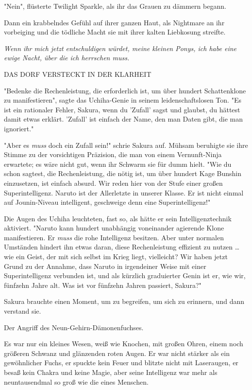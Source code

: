 {"Nein", flüsterte Twilight Sparkle, als ihr das Grauen zu dämmern begann.

Dann ein krabbelndes Gefühl auf ihrer ganzen Haut, als Nightmare an ihr vorbeiging und die tödliche Macht sie mit ihrer kalten Liebkosung streifte.

\emph{Wenn ihr mich jetzt entschuldigen würdet, meine kleinen Ponys, ich habe eine ewige Nacht, über die ich herrschen muss.}

DAS DORF VERSTECKT IN DER KLARHEIT

"Bedenke die Rechenleistung, die erforderlich ist, um über hundert Schattenklone zu manifestieren", sagte das Uchiha-Genie in seinem leidenschaftslosen Ton. "Es ist ein rationaler Fehler, Sakura, wenn du 'Zufall' sagst und glaubst, du hättest damit etwas erklärt. 'Zufall' ist einfach der Name, den man Daten gibt, die man ignoriert."

"Aber es \emph{muss} doch ein Zufall sein!" schrie Sakura auf. Mühsam beruhigte sie ihre Stimme zu der vorsichtigen Präzision, die man von einem Vernunft-Ninja erwartete; es wäre nicht gut, wenn ihr Schwarm sie für dumm hielt. "Wie du schon sagtest, die Rechenleistung, die nötig ist, um über hundert Kage Bunshin einzusetzen, ist einfach absurd. Wir reden hier von der Stufe einer großen Superintelligenz. Naruto ist der Allerletzte in unserer Klasse. Er ist nicht einmal auf Jounin-Niveau intelligent, geschweige denn eine Superintelligenz!"

Die Augen des Uchiha leuchteten, fast so, als hätte er sein Intelligenztechnik aktiviert. "Naruto kann hundert unabhängig voneinander agierende Klone manifestieren. Er \emph{muss} die rohe Intelligenz besitzen. Aber unter normalen Umständen hindert ihn etwas daran, diese Rechenleistung effizient zu nutzen … wie ein Geist, der mit sich selbst im Krieg liegt, vielleicht? Wir haben jetzt Grund zu der Annahme, dass Naruto in irgendeiner Weise mit einer Superintelligenz verbunden ist, und als kürzlich graduierter Genin ist er, wie wir, fünfzehn Jahre alt. Was ist vor fünfzehn Jahren passiert, Sakura?"

Sakura brauchte einen Moment, um zu begreifen, um sich zu erinnern, und dann verstand sie.

Der Angriff des Neun-Gehirn-Dämonenfuchses.

Es war nur ein kleines Wesen, weiß wie Knochen, mit großen Ohren, einem noch größeren Schwanz und glänzenden roten Augen. Er war nicht stärker als ein gewöhnlicher Fuchs, er spuckte kein Feuer und blitzte nicht mit Laseraugen, er besaß kein Chakra und keine Magie, aber seine Intelligenz war mehr als neuntausendmal so groß wie die eines Menschen.

}

